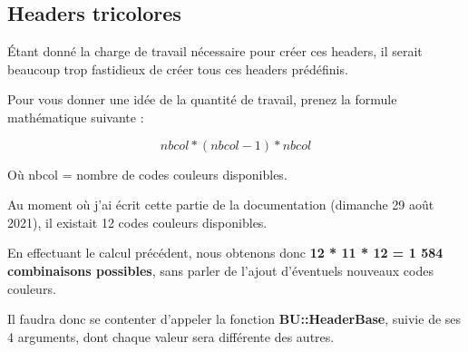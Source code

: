 \documentclass[a4paper,10pt]{article}
\begin{document}
\color{green}
\subsection{Headers tricolores}\color{white}

\begin{justify}
    Étant donné la charge de travail nécessaire pour créer ces headers, il serait beaucoup trop fastidieux de créer tous ces headers prédéfinis.
\end{justify}

\begin{justify}
    Pour vous donner une idée de la quantité de travail, prenez la formule mathématique suivante :
\end{justify}

\[nbcol * (nbcol - 1) * nbcol\]

\begin{justify}
    Où nbcol = nombre de codes couleurs disponibles.
\end{justify}

\begin{justify}
    Au moment où j'ai écrit cette partie de la documentation (dimanche 29 août 2021), il existait 12 codes couleurs disponibles.
\end{justify}

\begin{justify}
    En effectuant le calcul précédent, nous obtenons donc \textbf{12 * 11 * 12 = 1 584 combinaisons possibles}, sans parler de l'ajout d'éventuels nouveaux codes couleurs.
\end{justify}

\begin{justify}
    Il faudra donc se contenter d'appeler la fonction \textbf{\color{mauve}BU::HeaderBase}, suivie de ses 4 arguments, dont chaque valeur sera différente des autres.
\end{justify}
\end{document}
